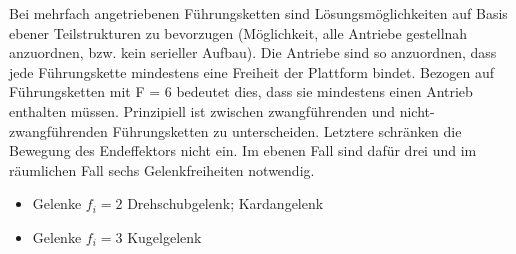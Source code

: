 Bei mehrfach angetriebenen Führungsketten sind Lösungsmöglichkeiten auf Basis ebener Teilstrukturen zu bevorzugen (Möglichkeit, alle Antriebe gestellnah anzuordnen, bzw. kein serieller Aufbau). Die Antriebe sind so anzuordnen, dass jede Führungskette mindestens eine Freiheit der Plattform bindet. Bezogen auf Führungsketten mit F = 6 bedeutet dies, dass sie mindestens einen Antrieb enthalten müssen. Prinzipiell ist zwischen zwangführenden und nicht-zwangführenden Führungsketten zu unterscheiden. Letztere schränken die Bewegung des Endeffektors nicht ein. Im ebenen Fall sind dafür drei und im räumlichen Fall sechs Gelenkfreiheiten notwendig.

\begin{itemize}
    \item Gelenke $f_i = 2$ Drehschubgelenk; Kardangelenk
    \item Gelenke $f_i = 3$ Kugelgelenk
\end{itemize}